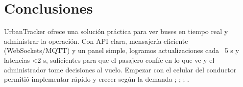 \section{Conclusiones}
UrbanTracker ofrece una solución práctica para ver buses en tiempo real y administrar la operación. Con API clara, mensajería eficiente (WebSockets/MQTT) y un panel simple, logramos actualizaciones cada ~5 s y latencias <2 s, suficientes para que el pasajero confíe en lo que ve y el administrador tome decisiones al vuelo. Empezar con el celular del conductor permitió implementar rápido y crecer según la demanda \cite{cityruta2018new}; \cite{stopbus2016new}; \cite{easyrest2022}; \cite{ingenieria2022}.